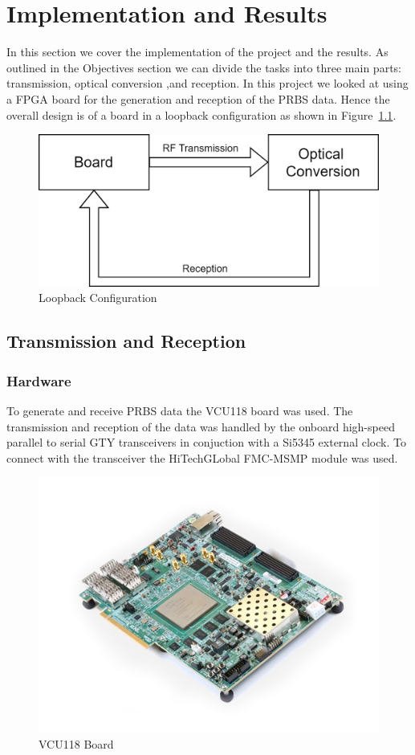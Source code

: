 \chapter{Implementation and Results}
In this section we cover the implementation of the project and the results.
As outlined in the Objectives section we can divide the tasks into three main
parts: transmission, optical conversion ,and reception. 
In this project we looked at using a FPGA board for the generation and
reception of the PRBS data.  Hence the overall design is of a board in a
loopback configuration as shown in Figure~\ref{fig:loopback}.

\begin{figure}[ht]
    \centering
    \includegraphics[width=0.5\linewidth]{img/loopback.png}
    \caption{Loopback Configuration}%
    \label{fig:loopback}
\end{figure}

\section{Transmission and Reception}%
\label{sec:transmission_and_reception}




\subsection{Hardware}%
\label{sub:hardware}
To generate and receive PRBS data the VCU118 board was used. The transmission
and reception of the data was handled by the onboard high-speed parallel to
serial GTY transceivers in conjuction with a Si5345 external clock. To connect
with the transceiver the HiTechGLobal FMC-MSMP module was used.
\begin{figure}[ht]
    \centering
    \includegraphics[width=0.5\linewidth]{img/board.jpg}
    \caption{VCU118 Board}%
    \label{fig:board}
\end{figure}

